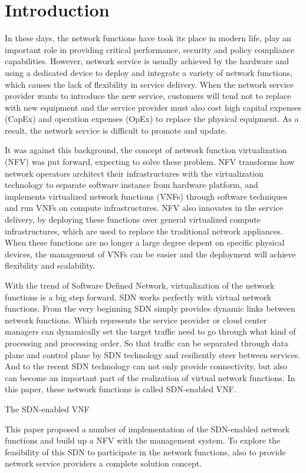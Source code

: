 \section{Introduction}
In these days, the network functions have took its place in modern life, play an important role in providing critical performance, security and policy compliance capabilities. However, network service is usually achieved by the hardware and using a dedicated device to deploy and integrate a variety of network functions, which causes the lack of flexibility in service delivery. When the network service provider wants to introduce the new service, customers will tend not to replace with new equipment and the service provider must also cost high capital expenses (CapEx) and operation expenses (OpEx) to replace the physical equipment. As a result, the network service is difficult to promote and update.

It was against this background, the concept of network function virtualization (NFV) was put forward, expecting to solve these problem. NFV transforms how network operators
architect their infrastructures with the virtualization technology to separate software instance from hardware platform, and implements virtualized network functions (VNFs) through software  techniques and run VNFs on compute infrastructures. NFV also innovates in the service delivery, by deploying these functions over general virtualized compute infrastructures, which are used to replace the traditional network appliances. When these functions are no longer a large degree depent on specific physical devices, the management of VNFs can be easier and the deployment will achieve flexibility and scalability.

With the trend of Software Defined Network, virtualization of the network functions is a big step forward. SDN works perfectly with virtual network functions. From the very beginning SDN simply provides dynamic links between network functions. Which represents the service provider or cloud center managers can dynamically set the target traffic need to go through what kind of processing and processing order. So that traffic can be separated through data plane and control plane by SDN technology and resiliently steer between services. And to the recent SDN technology can not only provide connectivity, but also can become an important part of the realization of virtual network functions. In this paper, these network functions is called SDN-enabled VNF.


The SDN-enabled VNF



This paper proposed a number of implementation of the SDN-enabled network functions and build up a NFV with the management system. To explore the feasibility of this SDN to participate in the network functions, also to provide network service providers a complete solution concept.
